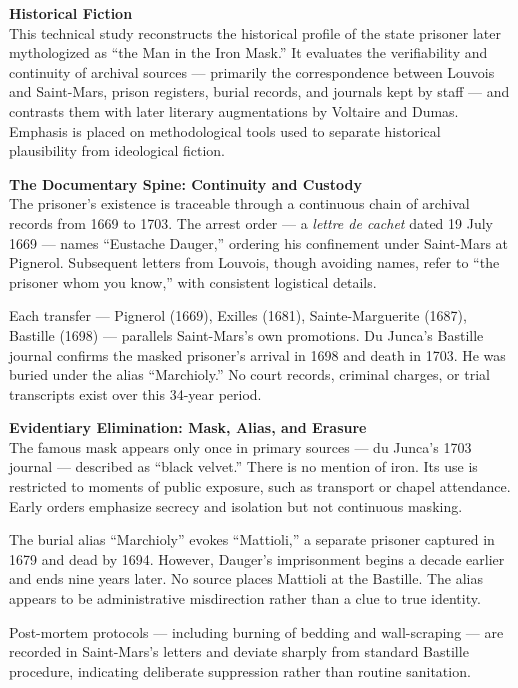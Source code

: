 \begin{technical}
{\Large\textbf{Historical Fiction}}\\[0.1em]

This technical study reconstructs the historical profile of the state prisoner later mythologized as “the Man in the Iron Mask.” It evaluates the verifiability and continuity of archival sources — primarily the correspondence between Louvois and Saint-Mars, prison registers, burial records, and journals kept by staff — and contrasts them with later literary augmentations by Voltaire and Dumas. Emphasis is placed on methodological tools used to separate historical plausibility from ideological fiction.

\textbf{The Documentary Spine: Continuity and Custody}\\[0.3em]
The prisoner’s existence is traceable through a continuous chain of archival records from 1669 to 1703. The arrest order — a \textit{lettre de cachet} dated 19 July 1669 — names “Eustache Dauger,” ordering his confinement under Saint-Mars at Pignerol. Subsequent letters from Louvois, though avoiding names, refer to “the prisoner whom you know,” with consistent logistical details.

Each transfer — Pignerol (1669), Exilles (1681), Sainte-Marguerite (1687), Bastille (1698) — parallels Saint-Mars’s own promotions. Du Junca’s Bastille journal confirms the masked prisoner’s arrival in 1698 and death in 1703. He was buried under the alias “Marchioly.” No court records, criminal charges, or trial transcripts exist over this 34-year period.

\textbf{Evidentiary Elimination: Mask, Alias, and Erasure}\\[0.3em]
The famous mask appears only once in primary sources — du Junca’s 1703 journal — described as “black velvet.” There is no mention of iron. Its use is restricted to moments of public exposure, such as transport or chapel attendance. Early orders emphasize secrecy and isolation but not continuous masking.

The burial alias “Marchioly” evokes “Mattioli,” a separate prisoner captured in 1679 and dead by 1694. However, Dauger’s imprisonment begins a decade earlier and ends nine years later. No source places Mattioli at the Bastille. The alias appears to be administrative misdirection rather than a clue to true identity.

Post-mortem protocols — including burning of bedding and wall-scraping — are recorded in Saint-Mars’s letters and deviate sharply from standard Bastille procedure, indicating deliberate suppression rather than routine sanitation.


\end{technical}
